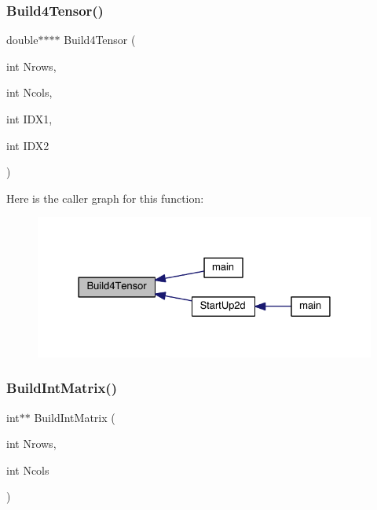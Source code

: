 \subsubsection{\texorpdfstring{Build4\+Tensor()}{Build4Tensor()}}
{\footnotesize\ttfamily double$\ast$$\ast$$\ast$$\ast$ Build4\+Tensor (\begin{DoxyParamCaption}\item[{int}]{Nrows,  }\item[{int}]{Ncols,  }\item[{int}]{I\+D\+X1,  }\item[{int}]{I\+D\+X2 }\end{DoxyParamCaption})}

Here is the caller graph for this function\+:\nopagebreak
\begin{figure}[H]
\begin{center}
\leavevmode
\includegraphics[width=328pt]{a00554_a745a480f3faf250c87406ddb1d8d0e4f_icgraph}
\end{center}
\end{figure}
\mbox{\label{a00554_a77f751d54b396015520a882d7a318e57}} 
\subsubsection{\texorpdfstring{Build\+Int\+Matrix()}{BuildIntMatrix()}}
{\footnotesize\ttfamily int$\ast$$\ast$ Build\+Int\+Matrix (\begin{DoxyParamCaption}\item[{int}]{Nrows,  }\item[{int}]{Ncols }\end{DoxyParamCaption})}

